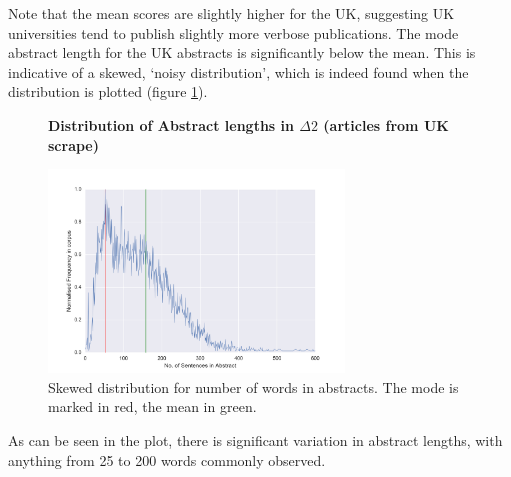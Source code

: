 Note that the mean scores are slightly higher for the UK, suggesting UK universities tend to publish slightly more verbose publications. The mode abstract length for the UK abstracts is significantly below the mean. This is indicative of a skewed, `noisy distribution', which is indeed found when the distribution is plotted (figure \ref{fig:abstract_sens}).
 \begin{figure}[H]
    \centering
    \textbf{Distribution of Abstract lengths in $\Delta2$ (articles from UK scrape)}\par\medskip
    \includegraphics[width=0.7\textwidth]{Appendix/Data_Acquisition/abstracts.png}
    \caption[Distribution of Abstract lengths in $\Delta2$ (Articles from UK)]{Skewed distribution for number of words in abstracts. The mode is marked in red, the mean in green.}
     \label{fig:abstract_sens}
\end{figure}
As can be seen in the plot, there is significant variation in abstract lengths, with anything from 25 to 200 words commonly observed.
\label{sec:SCRAPEANALYSIS}


